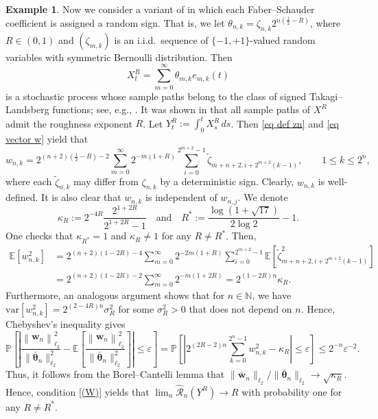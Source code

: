 \documentclass[12pt,reqno]{article}
\newcommand{\norm}[1]{\left\lVert {#1}\right\rVert}
\def\wh{\widehat}
\def\wt{\widetilde}
\numberwithin{equation}{section}
\def\var{\mbox{var}}
\def\cR{{\mathscr R}}
\theoremstyle{definition}
\newtheorem{example}[theorem]{Example}
\def\wt#1{\widetilde{#1}}
\def\wh{\widehat}
\def\wt{\widetilde}
\newcommand{\bE}{\mathbb{E}}
\newcommand{\bN}{\mathbb{N}}
\newcommand{\bP}{\mathbb{P}}
\begin{document}
\begin{example}\label{Random Takagi example}
	Now we consider a variant of   in which each Faber--Schauder coefficient is assigned a random sign. That is, we let $\theta_{n,k} = \zeta_{n,k}2^{n(\frac{1}{2}-R)}$, where $R\in(0,1)$ and $(\zeta_{m,k})$ is an i.i.d.~sequence of $\{-1,+1\}$-valued random variables with symmetric Bernoulli distribution. 	Then 	\begin{equation*}
		X^R_t = \sum_{m = 0}^{\infty}\theta_{m,k}e_{m,k}(t)
			\end{equation*}
	is a   stochastic process whose sample paths belong to the class of signed Takagi--Landsberg functions; see, e.g.,  \cite{Allaartflexible, HanSchiedZhang2,MishuraSchied2}.  It was shown in \cite[Theorem 2.1]{MishuraSchied2} that all sample paths of $X^R$ admit the roughness exponent $R$. Let $Y^R_t := \int_{0}^{t}X^R_s\,ds$. Then
\eqref{eq def zn} and \eqref{eq vector w} yield that
	\begin{equation*}
		w_{n,k} = 2^{(n+2)(\frac{1}{2} - R)-2}\sum_{m = 0}^{\infty}2^{-m(1+R)}\sum_{i = 0}^{2^{m+2}-1}\wt\zeta_{m+n+2,i + 2^{m+2}(k-1)}, \qquad 1 \le k \le 2^n,
	\end{equation*}
where each $\wt\zeta_{n,k}$ may differ from $\zeta_{n,k}$ by a deterministic sign. Clearly, $w_{n,k}$ is well-defined. It is also clear that $w_{n,k}$ is independent of $w_{n,j}$. We denote 
	$$\kappa_R := 2^{-4R}\frac{2^{1 + 2R}}{2^{1+2R}-1}\quad\text{and}\quad R^*:=\frac{\log \left(1+\sqrt{17}\right)}{2\log 2}-1.$$
	One checks that $\kappa_{R^*}=1$ and $\kappa_R \neq 1$ for any $R \neq R^\ast $. Then,
	\begin{equation*}
		\begin{split}
			\bE\left[w^2_{n,k}\right] &= 2^{(n+2)(1 - 2R)-4}\sum_{m = 0}^\infty 2^{-2m(1+R)}\sum_{i = 0}^{2^{m+2}-1}\bE\left[\wt\zeta^2_{m+n+2,i + 2^{m+2}(k-1)}\right]\\&= 2^{(n+2)(1 - 2R)-2}\sum_{m = 0}^{\infty}2^{-m(1+2R)} = 2^{(1-2R)n}\kappa_R.
		\end{split}
	\end{equation*}
	Furthermore, an analogous argument shows that for $n \in \bN$, we have $\var[w^2_{n,k}] = 2^{(2-4R)n}\sigma^2_R$ for some $\sigma^2_R > 0$ that does not depend on $n$. Hence, Chebyshev's inequality gives 
	\begin{equation*}
		\bP\left[\left|\frac{\norm{\bm w_n}^2_{\ell_2}}{\|\bar{\bm \theta}_n\|_{\ell_2}^2} - 	\bE\left[\frac{\norm{\bm w_n}^2_{\ell_2}}{\|\bar{\bm \theta}_n\|_{\ell_2}^2}\right] \right| \le \varepsilon\right] = 	\bP\left[\left|2^{(2R-2)n}\sum_{k = 0}^{2^n-1}w_{n,k}^2 - \kappa_R\right| \le \varepsilon\right]  \le 2^{-n}\varepsilon^{-2}.
	\end{equation*}
	Thus, it follows from the Borel--Cantelli lemma that ${\|\bar{\bm w}_n\|_{\ell_2}}/{\|\bar{\bm \theta}_n\|_{\ell_2}} \longrightarrow \sqrt{\kappa_R}$. Hence, condition \eqref{(W)} yields that $\lim_n \wh \cR_n(Y^R) \longrightarrow R$ with probability one for any $R \neq R^\ast$.
\end{example}
\end{document}
